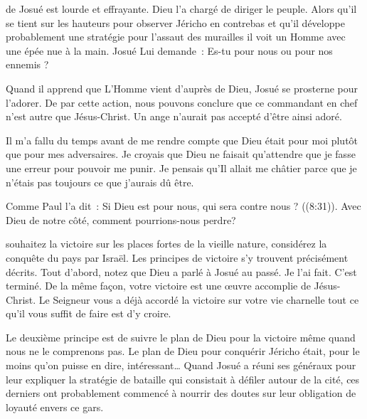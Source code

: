  de Josué est lourde et effrayante.
 Dieu l'a chargé de diriger le peuple.
 Alors qu'il se tient sur les hauteurs pour observer Jéricho en contrebas
 \ocadr et qu'il développe probablement une stratégie
 pour l'assaut des murailles \fcadr{}
 il voit un Homme avec une épée nue à la main.
 Josué Lui demande~: \og Es-tu pour nous ou pour nos ennemis ? \fg{}

Quand il apprend que L'Homme vient d'auprès de Dieu,
 Josué se prosterne pour l'adorer.
 De par cette action, nous pouvons conclure que ce commandant en chef
 n'est autre que Jésus-Christ. Un ange n'aurait pas accepté d'être ainsi adoré.

Il m'a fallu du temps avant de me rendre compte que Dieu
 était pour moi plutôt que pour mes adversaires.
 Je croyais que Dieu ne faisait qu'attendre
 que je fasse une erreur pour pouvoir me punir.
 Je pensais qu'Il allait me châtier
 parce que je n'étais pas toujours ce que j'aurais dû être.


Comme Paul l'a dit~:
 \og Si Dieu est pour nous, qui sera contre nous ? \fg{} ((8:31)).
 Avec Dieu de notre côté, comment pourrions-nous perdre? 

\dvrule






 souhaitez la victoire sur les places fortes
 de la vieille nature, considérez la conquête du pays par Israël.
 Les principes de victoire s'y trouvent précisément décrits.
 Tout d'abord, notez que Dieu a parlé à Josué au passé.
 \og Je l'ai fait. C'est terminé. \fg{}
 De la même façon, votre victoire est une œuvre accomplie de Jésus-Christ.
 Le Seigneur vous a déjà accordé la victoire sur votre vie charnelle
 \ocadr tout ce qu'il vous suffit de faire est d'y croire.

Le deuxième principe est de suivre le plan de Dieu pour la victoire
 même quand nous ne le comprenons pas.
 Le plan de Dieu pour conquérir Jéricho était,
 pour le moins qu'on puisse en dire, intéressant\dots{}
 Quand Josué a réuni ses généraux pour leur expliquer
 la stratégie de bataille qui consistait à défiler autour de la cité,
 ces derniers ont probablement commencé à nourrir des doutes
 sur leur obligation de loyauté envers ce gars.

